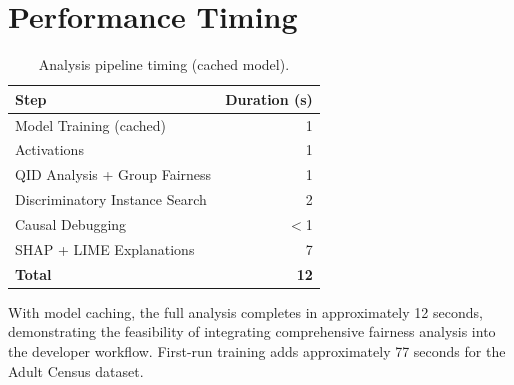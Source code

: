 \section{Performance Timing}

\begin{table}[H]
\centering
\caption{Analysis pipeline timing (cached model).}
\label{tab:timing}
\begin{tabular}{@{}lr@{}}
\toprule
\textbf{Step} & \textbf{Duration (s)} \\
\midrule
Model Training (cached) & 1 \\
Activations & 1 \\
QID Analysis + Group Fairness & 1 \\
Discriminatory Instance Search & 2 \\
Causal Debugging & $<$1 \\
SHAP + LIME Explanations & 7 \\
\midrule
\textbf{Total} & \textbf{12} \\
\bottomrule
\end{tabular}
\end{table}

With model caching, the full analysis completes in approximately 12 seconds, demonstrating the feasibility of integrating comprehensive fairness analysis into the developer workflow. First-run training adds approximately 77 seconds for the Adult Census dataset.
